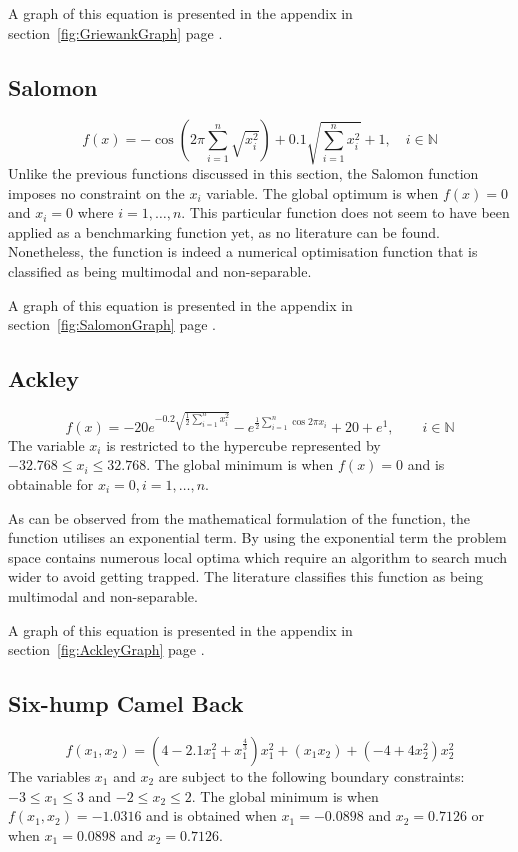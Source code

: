 A graph of this equation is presented in the appendix in section~\ref{fig:GriewankGraph} page \pageref{fig:GriewankGraph}.
\subsection{Salomon}
\begin{equation}
	f(x) = -\cos{(2\pi\sum_{i=1}^n\sqrt{x_i^2})} + 0.1 \sqrt{\sum_{i=1}^n x_i^2} + 1, \quad i \in \mathbb{N}
\end{equation}
Unlike the previous functions discussed in this section, the Salomon function imposes no constraint on the $x_i$ variable. The global optimum is when $f(x) = 0$ and $x_i = 0$ where $i = 1,\ldots,n$. This particular function does not seem to have been applied as a benchmarking function yet, as no literature can be found. Nonetheless, the function is indeed a numerical optimisation function that is classified as being multimodal and non-separable\cite{salamonwebsite}.

A graph of this equation is presented in the appendix in section~\ref{fig:SalomonGraph} page \pageref{fig:SalomonGraph}.
\subsection{Ackley}
\begin{equation}
	f(x) = -20e^{-0.2\sqrt{\frac{1}{2}\sum_{i=1}^n x_i^2}} - e^{\frac{1}{2}\sum_{i=1}^n\cos{2\pi x_i}} + 20 + e^1, \qquad i \in \mathbb{N}
\end{equation}
The variable $x_i$ is restricted to the hypercube represented by $-32.768 \leq x_i \leq 32.768$\cite{numericalABC,ABCCompareStudy,ARPSO,TestFunctions}. The global minimum is when $f(x) = 0$ and is obtainable for $x_i = 0, i = 1,\ldots,n$\cite{numericalABC,ABCCompareStudy,ARPSO,TestFunctions}.

As can be observed from the mathematical formulation of the function, the function utilises an exponential term. By using the exponential term the problem space contains numerous local optima which require an algorithm to search much wider to avoid getting trapped. The literature classifies this function as being multimodal and non-separable\cite{adaptPSO,ABCCompareStudy,numericalABC,TestFunctions}.

A graph of this equation is presented in the appendix in section~\ref{fig:AckleyGraph} page \pageref{fig:AckleyGraph}.
\subsection{Six-hump Camel Back}
\begin{equation}
	f(x_1,x_2) = (4 - 2.1x_1^2 + x_1^{\frac{4}{3}})x_1^2 + (x_1x_2) + (-4 + 4x_2^2)x_2^2
\end{equation}
The variables $x_1$ and $x_2$ are subject to the following boundary constraints: $-3 \leq x_1 \leq 3$ and $-2 \leq x_2 \leq 2$\cite{DistributedHierarchicalGA,TestFunctions}. The global minimum is when $f(x_1,x_2) = -1.0316$ and is obtained when $x_1 = -0.0898$ and $x_2 = 0.7126$ or when  $x_1 = 0.0898$ and $x_2 = 0.7126$\cite{DistributedHierarchicalGA,TestFunctions}. 

